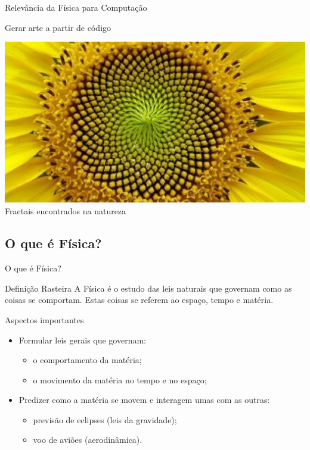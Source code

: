 \documentclass[xcolor=dvipsnames,table]{beamer}
\begin{document}
	\begin{frame}{Relevância da Física para Computação}
		\begin{block}{Gerar arte a partir de código}
			\begin{center}
	    		\includegraphics[height=.7\textheight]{images/fractais.jpg}
	    		\\Fractais encontrados na natureza
	  		\end{center}
		\end{block}
	\end{frame}
	
	\subsection{O que é Física?}
	\begin{frame}{O que é Física?}
		\begin{block}{Definição Rasteira}
			A Física é o estudo das leis naturais que governam como as coisas se comportam. Estas coisas se referem ao espaço, tempo e matéria.
		\end{block} 
		\begin{block}{Aspectos importantes}
			\begin{itemize}
				\item Formular leis gerais que governam: 
					\begin{itemize} 
						\item o comportamento da matéria;
						\item o movimento da matéria no tempo e no espaço;
					\end{itemize} 
				\item Predizer como a matéria se movem e interagem umas com as outras: 
					\begin{itemize}
						\item previsão de eclipses (leis da gravidade);
						\item voo de aviões (aerodinâmica).
					\end{itemize}
			\end{itemize}
		\end{block}	
	\end{frame}
	
\end{document}
